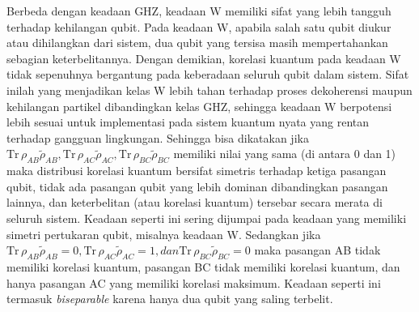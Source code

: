 Berbeda dengan keadaan GHZ, keadaan W memiliki sifat yang lebih tangguh terhadap kehilangan qubit. Pada keadaan W, apabila salah satu qubit diukur atau dihilangkan dari sistem, dua qubit yang tersisa masih mempertahankan sebagian keterbelitannya. Dengan demikian, korelasi kuantum pada keadaan W tidak sepenuhnya bergantung pada keberadaan seluruh qubit dalam sistem. Sifat inilah yang menjadikan kelas W lebih tahan terhadap proses dekoherensi maupun kehilangan partikel dibandingkan kelas GHZ, sehingga keadaan W berpotensi lebih sesuai untuk implementasi pada sistem kuantum nyata yang rentan terhadap gangguan lingkungan. Sehingga bisa dikatakan jika $\mathrm{Tr}\,\rho_{AB} \tilde{\rho}_{AB}, \mathrm{Tr}\,\rho_{AC} \tilde{\rho}_{AC}, \mathrm{Tr}\,\rho_{BC} \tilde{\rho}_{BC}$ memiliki nilai yang sama (di antara 0 dan 1) maka distribusi korelasi kuantum bersifat simetris terhadap ketiga pasangan qubit, tidak ada pasangan qubit yang lebih dominan dibandingkan pasangan lainnya, dan keterbelitan (atau korelasi kuantum) tersebar secara merata di seluruh sistem. Keadaan seperti ini sering dijumpai pada keadaan yang memiliki simetri pertukaran qubit, misalnya keadaan W. Sedangkan jika $\mathrm{Tr}\,\rho_{AB} \tilde{\rho}_{AB}=0, \mathrm{Tr}\,\rho_{AC} \tilde{\rho}_{AC}=1, dan \mathrm{Tr}\,\rho_{BC} \tilde{\rho}_{BC}=0$ maka pasangan AB tidak memiliki korelasi kuantum,
pasangan BC tidak memiliki korelasi kuantum, dan
hanya pasangan AC yang memiliki korelasi maksimum. Keadaan seperti ini termasuk \textit{biseparable} karena hanya dua qubit yang saling terbelit.

















